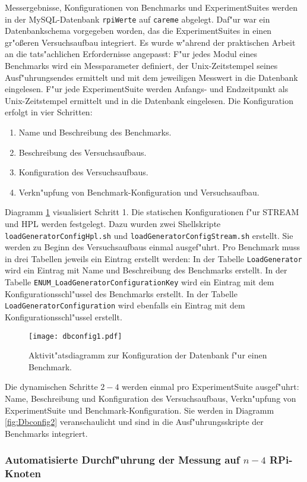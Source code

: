 Messergebnisse, Konfigurationen von Benchmarks und ExperimentSuites werden in der MySQL-Datenbank \texttt{rpiWerte} auf \texttt{careme} abgelegt. Daf"ur war ein Datenbankschema vorgegeben worden, das die ExperimentSuites in einen gr"o\ss eren Versuchsaufbau integriert. Es wurde w"ahrend der praktischen Arbeit an die tats"achlichen Erfordernisse angepasst: F"ur jedes Modul eines Benchmarks wird ein Messparameter definiert, der Unix-Zeitstempel seines Ausf"uhrungsendes ermittelt und mit dem jeweiligen Messwert in die Datenbank eingelesen. F"ur jede ExperimentSuite werden Anfangs- und Endzeitpunkt als Unix-Zeitstempel ermittelt und in die Datenbank eingelesen. Die Konfiguration erfolgt in vier Schritten:  
\begin{enumerate}\bfseries
	\item Name und Beschreibung des Benchmarks. 
	\item Beschreibung des Versuchsaufbaus. 
	\item Konfiguration des Versuchsaufbaus. 
	\item Verkn"upfung von Benchmark-Konfiguration und Versuchsaufbau.
\end{enumerate} 
Diagramm \ref{fig:Dbconfig1} visualisiert Schritt 1. Die statischen Konfigurationen f"ur STREAM und HPL werden festgelegt. Dazu wurden zwei Shellskripte \texttt{loadGeneratorCon\-figHpl.sh} und \texttt{loadGe\-nerator\-ConfigStream.sh} erstellt. Sie werden zu Beginn des Versuchsaufbaus einmal ausgef"uhrt. Pro Benchmark muss in drei Tabellen jeweils ein Eintrag erstellt werden: In der Tabelle \texttt{LoadGenerator} wird ein Eintrag mit Name und Beschreibung des Benchmarks erstellt. In der Tabelle \texttt{ENUM\_LoadGeneratorConfigura\-tionKey} wird ein Eintrag mit dem Konfigurationsschl"ussel des Benchmarks erstellt. In der Tabelle \texttt{LoadGeneratorConfiguration} wird ebenfalls ein Eintrag mit dem Konfigurationsschl"ussel erstellt.
\begin{figure}[htb]
\centering
\texttt{[image: dbconfig1.pdf]}
\caption{Aktivit"atsdiagramm zur Konfiguration der Datenbank f"ur einen Benchmark.}
\label{fig:Dbconfig1}
\end{figure}
Die dynamischen Schritte $2-4$ werden einmal pro ExperimentSuite ausgef"uhrt: Name, Beschreibung und Konfiguration des Versuchsaufbaus, Verkn"upfung von ExperimentSuite und Benchmark-Konfiguration. Sie werden in Diagramm \ref{fig:Dbconfig2} veranschaulicht und sind in die Ausf"uhrungsskripte der Benchmarks integriert. 

\subsubsection{Automatisierte Durchf"uhrung der Messung auf $n-4$ RPi-Knoten} 


